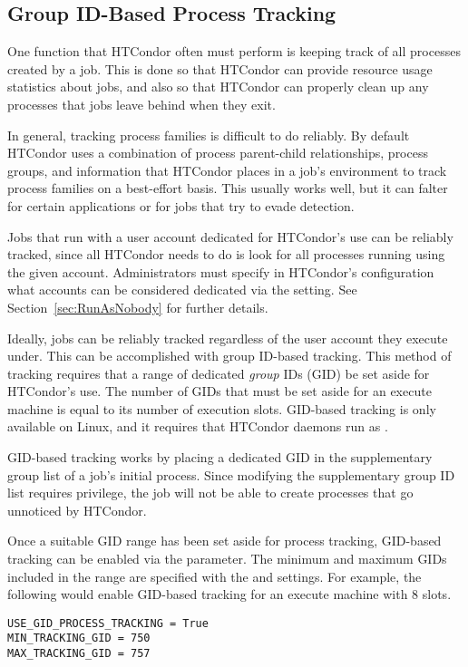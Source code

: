 \subsection{\label{sec:GroupTracking}Group ID-Based Process Tracking} 

One function that HTCondor often must perform is keeping track of all
processes created by a job. This is done so that HTCondor can provide
resource usage statistics about jobs, and also so that HTCondor can properly
clean up any processes that jobs leave behind when they exit.

In general, tracking process families is difficult to do reliably.
By default HTCondor uses a combination of process parent-child
relationships, process groups, and information that HTCondor places in a
job's environment to track process families on a best-effort
basis. This usually works well, but it can falter for certain
applications or for jobs that try to evade detection.

Jobs that run with a user account dedicated for HTCondor's use
can be reliably tracked, since all HTCondor needs to do is look for all
processes running using the given account. Administrators must specify
in HTCondor's configuration what accounts can be considered dedicated
via the  setting. See
Section~\ref{sec:RunAsNobody} for further details.

Ideally, jobs can be reliably tracked regardless of the user account
they execute under. This can be accomplished with group ID-based
tracking. This method of tracking requires that a range of dedicated
\emph{group} IDs (GID) be set aside for HTCondor's use. The number of GIDs
that must be set aside for an execute machine is equal to its number
of execution slots. 
GID-based tracking is only available on Linux, 
and it requires that HTCondor daemons run as .

GID-based tracking works by placing a dedicated GID in the
supplementary group list of a job's initial process. Since modifying
the supplementary group ID list requires
 privilege, the job will not be able to create processes
that go unnoticed by HTCondor.

Once a suitable GID range has been set aside for process tracking,
GID-based tracking can be enabled via the
 parameter. The minimum and maximum
GIDs included in the range are specified with the
 and 
settings. For example, the following would enable GID-based tracking
for an execute machine with 8 slots.
\begin{verbatim}
USE_GID_PROCESS_TRACKING = True
MIN_TRACKING_GID = 750
MAX_TRACKING_GID = 757
\end{verbatim}

